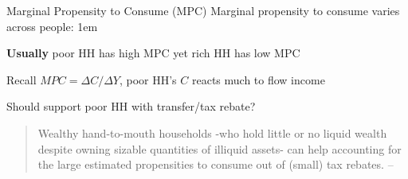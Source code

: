 \documentclass[11pt,aspectratio=43,usenames,dvipsnames]{beamer}
\let\olditemize=\itemize
\let\endolditemize=\enditemize
\renewenvironment{itemize}{\olditemize \itemsep1em}{\endolditemize}
\theoremstyle{definition}
\begin{document}
\begin{frame}{Marginal Propensity to Consume (MPC)}
\label{slide:Marginal_Propensity_to_Consume__MPC_}
    Marginal propensity to consume varies across people:
    \begin{itemize}
        \item \textbf{Usually} poor HH has \alert{high} MPC yet rich HH has \alert{low} MPC
        \item Recall $ MPC = \Delta C / \Delta Y$, poor HH's $ C $ reacts much to flow income
        \item Should support poor HH with transfer/tax rebate?

    \end{itemize}
        \vspace{1em}
            \begin{quote}
                Wealthy hand-to-mouth households -who hold \alert{little or no liquid wealth} despite owning sizable quantities of \alert{illiquid assets}- can help accounting for the \alert{large estimated propensities to consume} out of (small) tax rebates. \hfill-- \cite{Kaplan_Violante_2014_Econometrica}
            \end{quote}

\end{frame}
\end{document}
